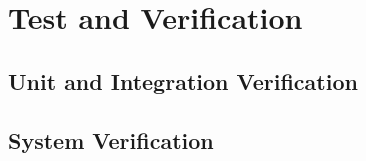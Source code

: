 \chapter{Test and Verification}
\section{Unit and Integration Verification}
\section{System Verification}